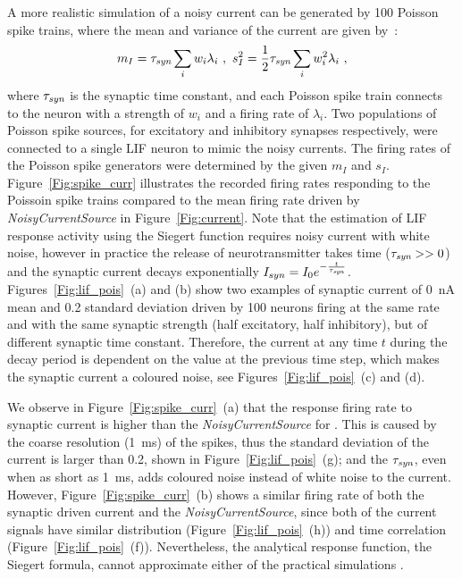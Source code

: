 \DIFdelend A more realistic simulation of a noisy current can be generated by 100 Poisson spike trains, 
	where the mean and variance of the current are given by~\citep{la2008response}:
	\begin{equation}
	m_I = \tau_{\textit{\textrm{syn}}}\sum_i w_i\lambda_{i}~, ~s_I^2=\frac{1}{2}\tau_{\textit{\textrm{syn}}}\sum_i w_i^2\lambda_{i}~,
	\label{equ:distr0}
	\end{equation}
	where $\tau_{\textit{\textrm{syn}}}$ is the synaptic time constant, and each Poisson spike train connects to the neuron with a strength of $w_i$ and a firing rate of $\lambda_i$.
	Two populations of Poisson spike sources, for excitatory and inhibitory synapses respectively, were connected to a single LIF neuron to mimic the noisy currents.
	The firing rates of the Poisson spike generators were determined by the given $m_I$ and $s_I$.
	Figure~\ref{Fig:spike_curr} illustrates the recorded firing rates responding to the Poissoin spike trains compared to the mean firing rate driven by \textit{NoisyCurrentSource} in Figure~\ref{Fig:current}.
	Note that the estimation of LIF response activity using the Siegert function requires noisy current with white noise, however
	in practice the release of neurotransmitter takes time ($\tau_{\textit{\textrm{syn}}} >> 0$) and the synaptic current decays exponentially $I_{syn} = I_0 e^{-\frac{t}{\tau_{\textit{\textrm{syn}}}}}$.
	Figures~\ref{Fig:lif_pois}~(a) and (b) show two examples of synaptic current of 0~nA mean and 0.2 standard deviation driven by 100 neurons firing at the same rate and with the same synaptic strength (half excitatory, half inhibitory), but of different synaptic time constant.
	Therefore, the current at any time $t$ during the decay period is dependent on the value at the previous time step, which makes the synaptic current a coloured noise, see Figures~\ref{Fig:lif_pois}~(c) and (d).

	We observe in Figure~\ref{Fig:spike_curr}~(a) that the response firing rate to synaptic current is higher than the \textit{NoisyCurrentSource} for \DIFdelbegin {}\DIFdelend \DIFaddbegin {}\DIFaddend .
	This is caused by the coarse resolution (1~ms) of the spikes, thus the standard deviation of the current is larger than 0.2, shown in Figure~\ref{Fig:lif_pois}~(g);
	and the $\tau_{\textit{\textrm{syn}}}$, even when as short as 1~ms, adds coloured noise instead of white noise to the current.
	However, Figure~\ref{Fig:spike_curr}~(b) shows a similar firing rate of both the synaptic driven current and the \textit{NoisyCurrentSource}, since both of the current signals have similar distribution (Figure~\ref{Fig:lif_pois}~(h)) and time correlation (Figure~\ref{Fig:lif_pois}~(f)).
	Nevertheless, the analytical response function, the Siegert formula, cannot approximate either of the practical simulations \DIFaddbegin {}\DIFaddend .

